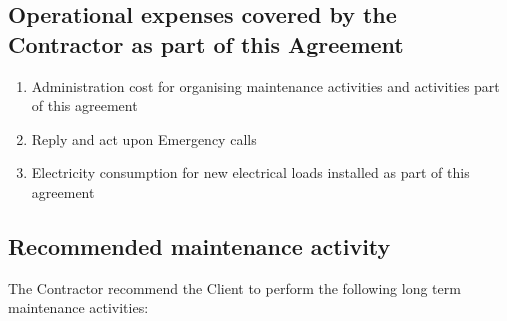 \subsection{Operational expenses covered by the Contractor as part of this Agreement}
\begin{enumerate}
	\item Administration cost for organising maintenance activities and activities part of this agreement
	\item Reply and act upon Emergency calls
	\item Electricity consumption for new electrical loads installed as part of this agreement
\end{enumerate}


\subsection{Recommended maintenance activity}

The Contractor recommend the Client to perform the following long term
maintenance activities:


\begin{center}
\end{center}
